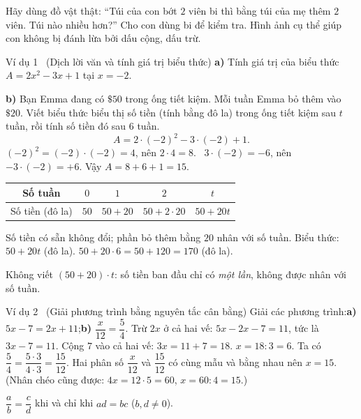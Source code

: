 \begin{parentbox}
Hãy dùng đồ vật thật: ``Túi của con bớt $2$ viên bi thì bằng túi của mẹ thêm $2$ viên. Túi nào nhiều hơn?''
Cho con dùng bi để kiểm tra. Hình ảnh cụ thể giúp con không bị đánh lừa bởi dấu cộng, dấu trừ.
\end{parentbox}


\begin{exbox}{Ví dụ 1 \ (Dịch lời văn và tính giá trị biểu thức)}
\textbf{a)} Tính giá trị của biểu thức $A=2x^2-3x+1$ tại $x=-2$.

\textbf{b)} Bạn Emma đang có $\$50$ trong ống tiết kiệm. Mỗi tuần Emma bỏ thêm vào $\$20$.
Viết biểu thức biểu thị số tiền (tính bằng đô la) trong ống tiết kiệm sau $t$ tuần, rồi tính số tiền đó sau $6$ tuần.
\guide
{}
\[A=2\cdot(-2)^2-3\cdot(-2)+1.\]
$(-2)^2=(-2)\cdot(-2)=4$, nên $2\cdot 4=8$. \ $3\cdot(-2)=-6$, nên $-3\cdot(-2)=+6$. Vậy $A=8+6+1=15$.
\begin{center}
\begin{tabular}{|c|c|c|c|c|}
\hline
\rowcolor{tmBlue!10} Số tuần & $0$ & $1$ & $2$ & $t$\\ \hline
Số tiền (đô la) & $50$ & $50+20$ & $50+2\cdot 20$ & $50+20t$\\ \hline
\end{tabular}
\end{center}
Số tiền có sẵn không đổi; phần bỏ thêm bằng $20$ nhân với số tuần. Biểu thức: $50+20t$ (đô la).
$50+20\cdot 6=50+120=170$ (đô la).
\begin{warnbox}Không viết $(50+20)\cdot t$: số tiền ban đầu chỉ có \emph{một lần}, không được nhân với số tuần.\end{warnbox}
\end{exbox}

\begin{exbox}{Ví dụ 2 \ (Giải phương trình bằng nguyên tắc cân bằng)}
Giải các phương trình:\quad \textbf{a)} $5x-7=2x+11$;\qquad \textbf{b)} $\dfrac{x}{12}=\dfrac{5}{4}$.
\guide
{}
Trừ $2x$ ở cả hai vế: $5x-2x-7=11$, tức là $3x-7=11$.
Cộng $7$ vào cả hai vế: $3x=11+7=18$.
$x=18:3=6$.
Ta có $\dfrac{5}{4}=\dfrac{5\cdot 3}{4\cdot 3}=\dfrac{15}{12}$. Hai phân số $\dfrac{x}{12}$ và $\dfrac{15}{12}$ có cùng mẫu
và bằng nhau nên $x=15$. (Nhân chéo cũng được: $4x=12\cdot 5=60$, $x=60:4=15$.)
\begin{recallbox}$\dfrac{a}{b}=\dfrac{c}{d}$ khi và chỉ khi $ad=bc$ ($b,d\neq 0$).\end{recallbox}
\end{exbox}

